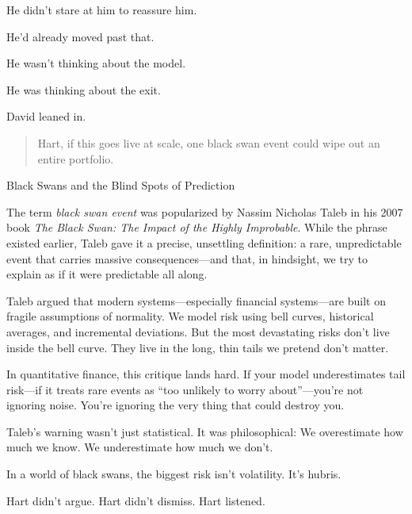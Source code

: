 He didn't stare at him to reassure him. 

He’d already moved past that.

He wasn’t thinking about the model.

He was thinking about the exit.

David leaned in.

\begin{quote}
Hart, if this goes live at scale, one black swan event could wipe out an 
entire portfolio.
\end{quote}

\medskip

\begin{HistoricalSidebar}{Black Swans and the Blind Spots of Prediction}

  The term \textit{black swan event} was popularized by Nassim Nicholas Taleb in his 2007 book \textit{The Black Swan: 
  The Impact of the Highly Improbable}. While the phrase existed earlier, Taleb gave it a precise, unsettling definition: 
  a rare, unpredictable event that carries massive consequences—and that, in hindsight, we try to explain as if it 
  were predictable all along.

  \medskip
  
  Taleb argued that modern systems—especially financial systems—are built on fragile assumptions of normality. We model 
  risk using bell curves, historical averages, and incremental deviations. But the most devastating risks don’t live 
  inside the bell curve. They live in the long, thin tails we pretend don’t matter.
  
  \medskip
  
  In quantitative finance, this critique lands hard. If your model underestimates tail risk—if it treats rare events 
  as “too unlikely to worry about”—you’re not ignoring noise. You’re ignoring the very thing that could destroy you.

  \medskip
  
  Taleb’s warning wasn’t just statistical. It was philosophical:  
  We overestimate how much we know.  
  We underestimate how much we don’t.

  \medskip
  
  In a world of black swans, the biggest risk isn’t volatility.  
  It’s hubris.
  
\end{HistoricalSidebar}

\medskip


Hart didn’t argue. Hart didn’t dismiss.  Hart listened.

